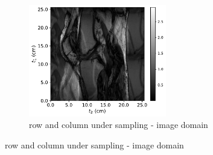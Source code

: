 \documentclass[12pt,twoside]{article}
\begin{document}
\begin{enumerate}
\begin{enumerate}
\begin{figure}[H]
   \begin{subfigure}[]{.5\textwidth}
   \centering   
        \includegraphics[width=60mm]{code/mr_undersampling/mri_even_rows_columns_recons.pdf}
        \caption{row and column under sampling - image domain}
    \end{subfigure} 
\end{figure}




\end{enumerate}
\end{enumerate}
\end{document}
